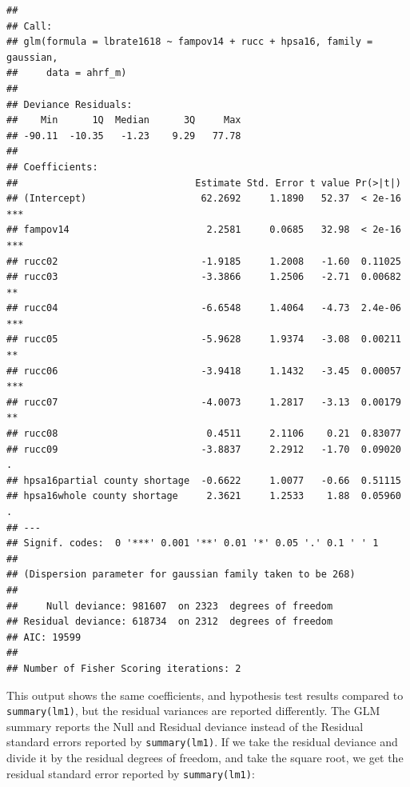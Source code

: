 \documentclass[
]{article}
\newenvironment{Shaded}{\begin{snugshade}}{\end{snugshade}}
\newcommand{\FunctionTok}[1]{\textcolor[rgb]{0.00,0.00,0.00}{#1}}
\newcommand{\NormalTok}[1]{#1}
\newcommand{\SpecialCharTok}[1]{\textcolor[rgb]{0.00,0.00,0.00}{#1}}
\begin{document}
\begin{verbatim}
## 
## Call:
## glm(formula = lbrate1618 ~ fampov14 + rucc + hpsa16, family = gaussian, 
##     data = ahrf_m)
## 
## Deviance Residuals: 
##    Min      1Q  Median      3Q     Max  
## -90.11  -10.35   -1.23    9.29   77.78  
## 
## Coefficients:
##                               Estimate Std. Error t value Pr(>|t|)    
## (Intercept)                    62.2692     1.1890   52.37  < 2e-16 ***
## fampov14                        2.2581     0.0685   32.98  < 2e-16 ***
## rucc02                         -1.9185     1.2008   -1.60  0.11025    
## rucc03                         -3.3866     1.2506   -2.71  0.00682 ** 
## rucc04                         -6.6548     1.4064   -4.73  2.4e-06 ***
## rucc05                         -5.9628     1.9374   -3.08  0.00211 ** 
## rucc06                         -3.9418     1.1432   -3.45  0.00057 ***
## rucc07                         -4.0073     1.2817   -3.13  0.00179 ** 
## rucc08                          0.4511     2.1106    0.21  0.83077    
## rucc09                         -3.8837     2.2912   -1.70  0.09020 .  
## hpsa16partial county shortage  -0.6622     1.0077   -0.66  0.51115    
## hpsa16whole county shortage     2.3621     1.2533    1.88  0.05960 .  
## ---
## Signif. codes:  0 '***' 0.001 '**' 0.01 '*' 0.05 '.' 0.1 ' ' 1
## 
## (Dispersion parameter for gaussian family taken to be 268)
## 
##     Null deviance: 981607  on 2323  degrees of freedom
## Residual deviance: 618734  on 2312  degrees of freedom
## AIC: 19599
## 
## Number of Fisher Scoring iterations: 2
\end{verbatim}

This output shows the same coefficients, and hypothesis test results compared to \texttt{summary(lm1)}, but the residual variances are reported differently. The GLM summary reports the Null and Residual deviance instead of the Residual standard errors reported by \texttt{summary(lm1)}. If we take the residual deviance and divide it by the residual degrees of freedom, and take the square root, we get the residual standard error reported by \texttt{summary(lm1)}:

\begin{Shaded}
\end{Shaded}
\end{document}
